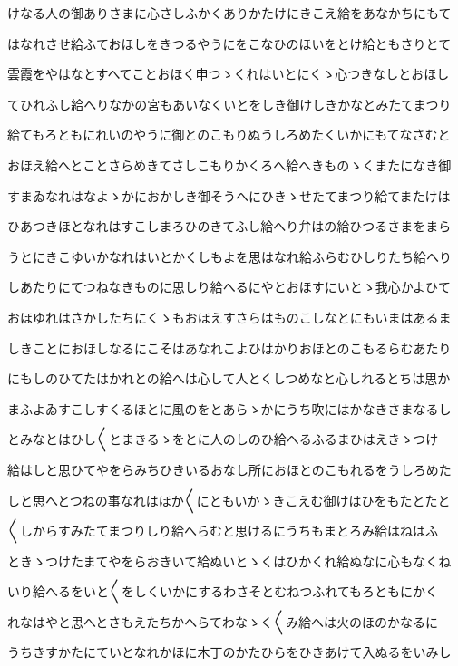 \documentclass[a4paper,11pt,landscape]{ltjtarticle}
\begin{document}
けなる人の御ありさまに心さしふかくありかたけにきこえ給をあなかちにもて
\par\medskip
はなれさせ給ふておほしをきつるやうにをこなひのほいをとけ給ともさりとて
\par\medskip
雲霞をやはなとすへてことおほく申つゝくれはいとにくゝ心つきなしとおほし
\par\medskip
てひれふし給へりなかの宮もあいなくいとをしき御けしきかなとみたてまつり
\par\medskip
給てもろともにれいのやうに御とのこもりぬうしろめたくいかにもてなさむと
\par\medskip
おほえ給へとことさらめきてさしこもりかくろへ給へきものゝくまたになき御
\par\medskip
すまゐなれはなよゝかにおかしき御そうへにひきゝせたてまつり給てまたけは
\par\medskip
ひあつきほとなれはすこしまろひのきてふし給へり弁はの給ひつるさまをまら
\par\medskip
うとにきこゆいかなれはいとかくしもよを思はなれ給ふらむひしりたち給へり
\par\medskip
しあたりにてつねなきものに思しり給へるにやとおほすにいとゝ我心かよひて
\par\medskip
おほゆれはさかしたちにくゝもおほえすさらはものこしなとにもいまはあるま
\par\medskip
しきことにおほしなるにこそはあなれこよひはかりおほとのこもるらむあたり
\par\medskip
にもしのひてたはかれとの給へは心して人とくしつめなと心しれるとちは思か
\par\medskip
まふよゐすこしすくるほとに風のをとあらゝかにうち吹にはかなきさまなるし
\par\medskip
とみなとはひし〱とまきるゝをとに人のしのひ給へるふるまひはえきゝつけ
\par\medskip
給はしと思ひてやをらみちひきいるおなし所におほとのこもれるをうしろめた
\par\medskip
しと思へとつねの事なれはほか〱にともいかゝきこえむ御けはひをもたとたと
\par\medskip
〱しからすみたてまつりしり給へらむと思けるにうちもまとろみ給はねはふ
\par\medskip
ときゝつけたまてやをらおきいて給ぬいとゝくはひかくれ給ぬなに心もなくね
\par\medskip
いり給へるをいと〱をしくいかにするわさそとむねつふれてもろともにかく
\par\medskip
れなはやと思へとさもえたちかへらてわなゝく〱み給へは火のほのかなるに
\par\medskip
うちきすかたにていとなれかほに木丁のかたひらをひきあけて入ぬるをいみし
\end{document}
